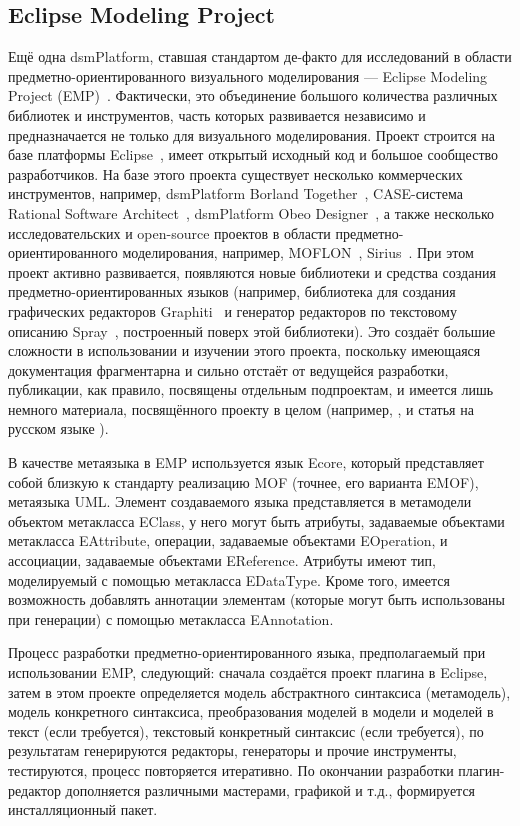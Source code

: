 \subsection{Eclipse Modeling Project}
Ещё одна \ac{dsmPlatform}, ставшая стандартом де-факто для исследований в области предметно-ориентированного визуального моделирования --- 
Eclipse Modeling Project (EMP)~\cite{emp}. Фактически, это объединение большого количества 
различных библиотек и инструментов, часть которых развивается независимо и предназначается не только 
для визуального моделирования. Проект строится на базе платформы Eclipse~\cite{eclipse}, 
имеет открытый исходный код и большое сообщество разработчиков. На базе этого 
проекта существует несколько коммерческих инструментов, например, \ac{dsmPlatform} Borland Together~\cite{together}, 
CASE-система Rational Software Architect~\cite{rsa}, \ac{dsmPlatform} Obeo Designer~\cite{obeoDesigner}, 
а также несколько исследовательских и open-source проектов в области предметно-ориентированного моделирования, например, 
MOFLON~\cite{amelunxen2008metamodel}, Sirius~\cite{viyovic2014sirius}. При этом проект активно развивается, появляются 
новые библиотеки и средства создания предметно-ориентированных языков (например, библиотека для создания графических редакторов 
Graphiti~\cite{graphiti} и генератор редакторов по текстовому описанию Spray~\cite{spray}, 
построенный поверх этой библиотеки). Это создаёт большие сложности в использовании и изучении этого проекта, поскольку имеющаяся документация 
фрагментарна и сильно отстаёт от ведущейся разработки, публикации, как правило, посвящены 
отдельным подпроектам, и имеется лишь немного материала, посвящённого проекту в целом 
(например, \cite{gronback2009eclipse}, и статья на русском языке \cite{sorokin2010obzor}).

В качестве метаязыка в EMP используется язык Ecore, который представляет собой близкую 
к стандарту реализацию MOF (точнее, его варианта EMOF), метаязыка UML. Элемент создаваемого 
языка представляется в метамодели объектом метакласса EClass, у него могут быть атрибуты, 
задаваемые объектами метакласса EAttribute, операции, задаваемые объектами EOperation, и 
ассоциации, задаваемые объектами EReference. Атрибуты имеют тип, моделируемый с помощью 
метакласса EDataType. Кроме того, имеется возможность добавлять аннотации элементам 
(которые могут быть использованы при генерации) с помощью метакласса EAnnotation.

Процесс разработки предметно-ориентированного языка, предполагаемый при использовании EMP, 
следующий: сначала создаётся проект плагина в Eclipse, затем в этом проекте определяется 
модель абстрактного синтаксиса (метамодель), модель конкретного синтаксиса, преобразования 
моделей в модели и моделей в текст (если требуется), текстовый конкретный синтаксис 
(если требуется), по результатам генерируются редакторы, генераторы и прочие инструменты, 
тестируются, процесс повторяется итеративно. По окончании разработки плагин-редактор 
дополняется различными мастерами, графикой и т.д., формируется инсталляционный пакет.

